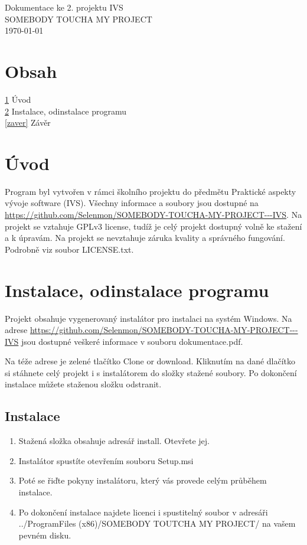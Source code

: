 \documentclass[a4paper, 11pt]{article}
\begin{document}
\begin{center}
\Large{Dokumentace ke 2. projektu IVS\\\medskip}
\normalsize
SOMEBODY TOUCHA MY PROJECT\\\medskip
\today\\\bigskip
\end{center}


\section*{Obsah}
\ref{uvod} \quad Úvod \hfill \pageref{uvod}\medskip \\
\ref{instalace} \quad Instalace, odinstalace programu \hfill \pageref{instalace}\medskip \\
\ref{zaver} \quad Závěr \hfill \pageref{zaver}

\newpage


\section{Úvod}\label{uvod}
Program byl vytvořen v rámci školního projektu do předmětu Praktické aspekty vývoje software (IVS). Všechny informace a soubory jsou dostupné na \url{https://github.com/Selenmon/SOMEBODY-TOUCHA-MY-PROJECT---IVS}. Na projekt se vztahuje GPLv3 license, tudíž je celý projekt dostupný volně ke stažení a k úpravám. Na projekt se nevztahuje záruka kvality a správného fungování. Podrobně viz soubor LICENSE.txt.

\section{Instalace, odinstalace programu}\label{instalace}
Projekt obsahuje vygenerovaný instalátor pro instalaci na systém Windows. Na adrese \url{https://github.com/Selenmon/SOMEBODY-TOUCHA-MY-PROJECT---IVS} jsou dostupné veškeré informace v souboru dokumentace.pdf.\par
Na téže adrese je zelené tlačítko Clone or download. Kliknutím na dané dlačítko si stáhnete celý projekt i s instalátorem do složky stažené soubory. Po dokončení instalace můžete staženou složku odstranit.

\subsection*{Instalace}
\begin{enumerate}
\item Stažená složka obsahuje adresář install. Otevřete jej.
\item Instalátor spustíte otevřením souboru Setup.msi
\item Poté se řiďte pokyny instalátoru, který vás provede celým průběhem instalace.
\item Po dokončení instalace najdete licenci i spustitelný soubor v adresáři ../ProgramFiles (x86)/SOMEBODY TOUTCHA MY PROJECT/ na vašem pevném disku.
\end{enumerate}
\end{document}
